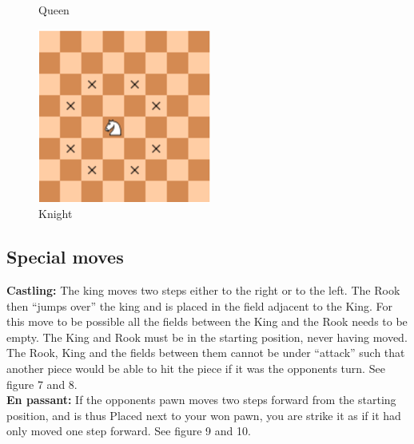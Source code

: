 \documentclass{article}
\begin{document}
\begin{figure}[!htb]
  \caption{Queen}\label{fig:chess5}
\endminipage\hfill
{}%
  \includegraphics[width=\linewidth]{chess6}
  \caption{Knight}\label{fig:chess6}
\endminipage
\end{figure}

\newpage
\subsection*{Special moves}
\textbf{Castling:} The king moves two steps either to the right or to the left. The Rook then “jumps over” the king and is placed in the field adjacent to the King. For this move to be possible all the fields between the King and the Rook needs to be empty. The King and Rook must be in the starting position, never having moved. The Rook, King and the fields between them cannot be under “attack” such that another piece would be able to hit the piece if it was the opponents turn. See figure 7 and 8. \\

\noindent\textbf{En passant:} If the opponents pawn moves two steps forward from the starting position, and is thus 
Placed next to your won pawn, you are strike it as if it had only moved one step forward. See figure 9 and 10.
\end{document}
